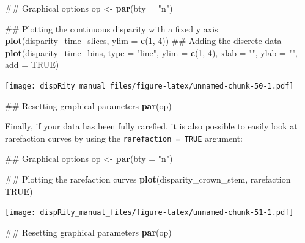 \documentclass[]{book}
\newenvironment{Shaded}{\begin{snugshade}}{\end{snugshade}}
\newcommand{\KeywordTok}[1]{\textcolor[rgb]{0.13,0.29,0.53}{\textbf{#1}}}
\newcommand{\DataTypeTok}[1]{\textcolor[rgb]{0.13,0.29,0.53}{#1}}
\newcommand{\DecValTok}[1]{\textcolor[rgb]{0.00,0.00,0.81}{#1}}
\newcommand{\StringTok}[1]{\textcolor[rgb]{0.31,0.60,0.02}{#1}}
\newcommand{\OtherTok}[1]{\textcolor[rgb]{0.56,0.35,0.01}{#1}}
\newcommand{\NormalTok}[1]{#1}
\theoremstyle{definition}
\theoremstyle{definition}
\theoremstyle{remark}
\begin{document}
\begin{Shaded}
\begin{Highlighting}[]
\NormalTok{## Graphical options}
\NormalTok{op <-}\StringTok{ }\KeywordTok{par}\NormalTok{(}\DataTypeTok{bty =} \StringTok{"n"}\NormalTok{)}

\NormalTok{## Plotting the continuous disparity with a fixed y axis}
\KeywordTok{plot}\NormalTok{(disparity_time_slices, }\DataTypeTok{ylim =} \KeywordTok{c}\NormalTok{(}\DecValTok{1}\NormalTok{, }\DecValTok{4}\NormalTok{))}
\NormalTok{## Adding the discrete data}
\KeywordTok{plot}\NormalTok{(disparity_time_bins, }\DataTypeTok{type =} \StringTok{"line"}\NormalTok{, }\DataTypeTok{ylim =} \KeywordTok{c}\NormalTok{(}\DecValTok{1}\NormalTok{, }\DecValTok{4}\NormalTok{), }\DataTypeTok{xlab =} \StringTok{""}\NormalTok{, }\DataTypeTok{ylab =} \StringTok{""}\NormalTok{,}
    \DataTypeTok{add =} \OtherTok{TRUE}\NormalTok{)}
\end{Highlighting}
\end{Shaded}

\texttt{[image: dispRity\_manual\_files/figure-latex/unnamed-chunk-50-1.pdf]}

\begin{Shaded}
\begin{Highlighting}[]
\NormalTok{## Resetting graphical parameters}
\KeywordTok{par}\NormalTok{(op)}
\end{Highlighting}
\end{Shaded}

Finally, if your data has been fully rarefied, it is also possible to
easily look at rarefaction curves by using the
\texttt{rarefaction\ =\ TRUE} argument:

\begin{Shaded}
\begin{Highlighting}[]
\NormalTok{## Graphical options}
\NormalTok{op <-}\StringTok{ }\KeywordTok{par}\NormalTok{(}\DataTypeTok{bty =} \StringTok{"n"}\NormalTok{)}

\NormalTok{## Plotting the rarefaction curves}
\KeywordTok{plot}\NormalTok{(disparity_crown_stem, }\DataTypeTok{rarefaction =} \OtherTok{TRUE}\NormalTok{)}
\end{Highlighting}
\end{Shaded}

\texttt{[image: dispRity\_manual\_files/figure-latex/unnamed-chunk-51-1.pdf]}

\begin{Shaded}
\begin{Highlighting}[]
\NormalTok{## Resetting graphical parameters}
\KeywordTok{par}\NormalTok{(op)}
\end{Highlighting}
\end{Shaded}
\end{document}
